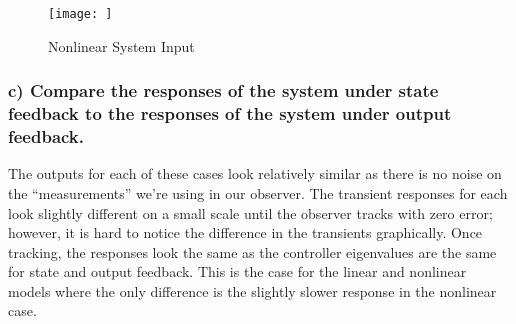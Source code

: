 \begin{figure}[!ht]
    \centering
    \texttt{[image: ]}
    \caption{Nonlinear System Input}
    \label{}
\end{figure}

\clearpage

\subsubsection*{c) Compare the responses of the system under state feedback to the responses of the system under
    output feedback. }

The outputs for each of these cases look relatively similar as there is no noise on the ``measurements” we’re using in our observer. The transient responses for each look slightly different on a small scale until the observer tracks with zero error; however, it is hard to notice the difference in the transients graphically. Once tracking, the responses look the same as the controller eigenvalues are the same for state and output feedback. This is the case for the linear and nonlinear models where the only difference is the slightly slower response in the nonlinear case.